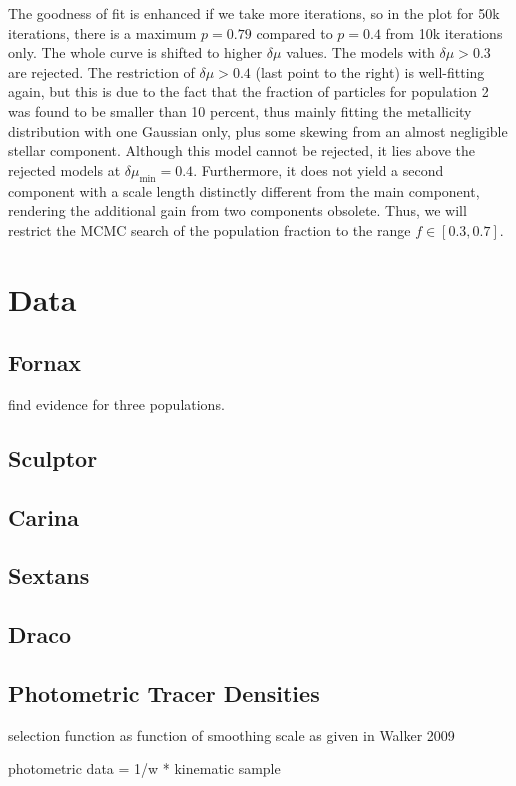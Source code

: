 The goodness of fit is enhanced if we take more iterations, so in the
plot for 50k iterations, there is a maximum $p=0.79$ compared to
$p=0.4$ from 10k iterations only. The whole curve is shifted to higher
$\delta \mu$ values. The models with $\delta \mu>0.3$ are
rejected. The restriction of $\delta \mu>0.4$ (last point to the
right) is well-fitting again, but this is due to the fact that the
fraction of particles for population 2 was found to be smaller than 10
percent, thus mainly fitting the metallicity distribution with one
Gaussian only, plus some skewing from an almost negligible stellar
component. Although this model cannot be rejected, it lies above the
rejected models at $\delta\mu_{\min}=0.4$. Furthermore, it does not
yield a second component with a scale length distinctly different from
the main component, rendering the additional gain from two components
obsolete. Thus, we will restrict the MCMC search of the population
fraction to the range $f\in[0.3,0.7]$.





%
\section{Data}

\subsection{Fornax}
 find evidence for three populations.

\subsection{Sculptor}

\subsection{Carina}

\subsection{Sextans}

\subsection{Draco}

\subsection{Photometric Tracer Densities}
selection function as function of smoothing scale as given in Walker
2009

photometric data = 1/w * kinematic sample



